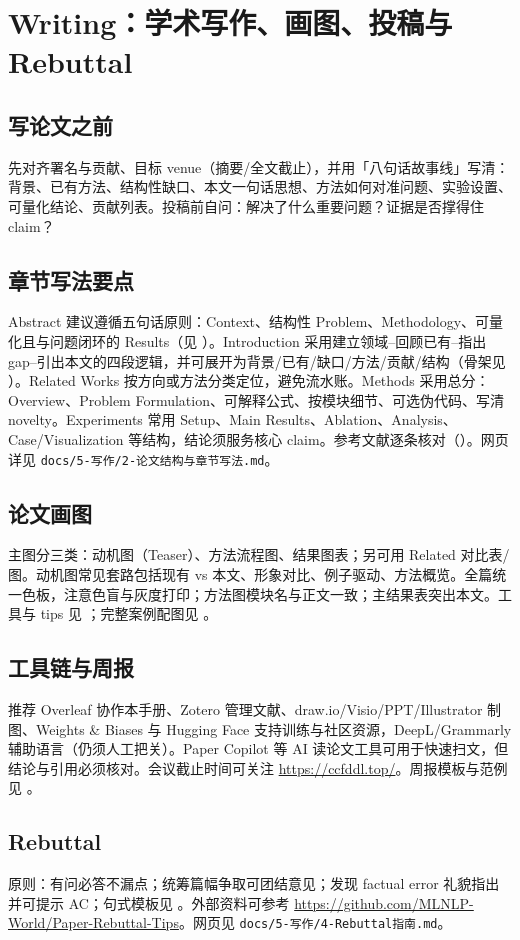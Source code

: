 ﻿\section{Writing：学术写作、画图、投稿与 Rebuttal}
\label{sec:writing}


\subsection{写论文之前}
先对齐署名与贡献、目标 venue（摘要/全文截止），并用「八句话故事线」写清：背景、已有方法、结构性缺口、本文一句话思想、方法如何对准问题、实验设置、可量化结论、贡献列表。投稿前自问：解决了什么重要问题？证据是否撑得住 claim？

\subsection{章节写法要点}
Abstract 建议遵循五句话原则：Context、结构性 Problem、Methodology、可量化且与问题闭环的 Results（见 ）。Introduction 采用建立领域--回顾已有--指出 gap--引出本文的四段逻辑，并可展开为背景/已有/缺口/方法/贡献/结构（骨架见 ）。Related Works 按方向或方法分类定位，避免流水账。Methods 采用总分：Overview、Problem Formulation、可解释公式、按模块细节、可选伪代码、写清 novelty。Experiments 常用 Setup、Main Results、Ablation、Analysis、Case/Visualization 等结构，结论须服务核心 claim。参考文献逐条核对（）。网页详见 \texttt{docs/5-写作/2-论文结构与章节写法.md}。

\subsection{论文画图}
主图分三类：动机图（Teaser）、方法流程图、结果图表；另可用 Related 对比表/图。动机图常见套路包括现有 vs 本文、形象对比、例子驱动、方法概览。全篇统一色板，注意色盲与灰度打印；方法图模块名与正文一致；主结果表突出本文。工具与 tips 见 ；完整案例配图见 。

\subsection{工具链与周报}
推荐 Overleaf 协作本手册、Zotero 管理文献、draw.io/Visio/PPT/Illustrator 制图、Weights \& Biases 与 Hugging Face 支持训练与社区资源，DeepL/Grammarly 辅助语言（仍须人工把关）。Paper Copilot 等 AI 读论文工具可用于快速扫文，但结论与引用必须核对。会议截止时间可关注 \url{https://ccfddl.top/}。周报模板与范例见 。

\subsection{Rebuttal}
原则：有问必答不漏点；统筹篇幅争取可团结意见；发现 factual error 礼貌指出并可提示 AC；句式模板见 。外部资料可参考 \url{https://github.com/MLNLP-World/Paper-Rebuttal-Tips}。网页见 \texttt{docs/5-写作/4-Rebuttal指南.md}。
